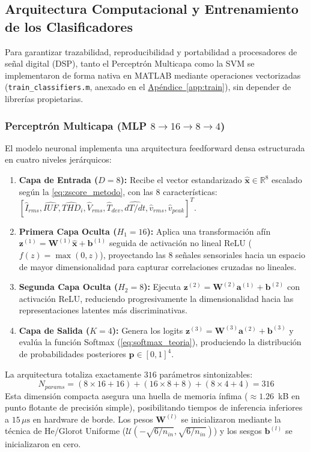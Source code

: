 \documentclass[conference]{IEEEtran}
\begin{document}
\subsection{Arquitectura Computacional y Entrenamiento de los Clasificadores}

Para garantizar trazabilidad, reproducibilidad y portabilidad a procesadores de señal digital (DSP), tanto el Perceptrón Multicapa como la SVM se implementaron de forma nativa en MATLAB mediante operaciones vectorizadas (\texttt{train\_classifiers.m}, anexado en el \hyperref[app:train]{Apéndice~\ref*{app:train}}), sin depender de librerías propietarias.

\subsubsection{\texorpdfstring{Perceptrón Multicapa (MLP $8 \to 16 \to 8 \to 4$)}{Perceptrón Multicapa (MLP 8 a 16 a 8 a 4)}}
El modelo neuronal implementa una arquitectura feedforward densa estructurada en cuatro niveles jerárquicos:
\begin{enumerate}
    \item \textbf{Capa de Entrada ($D = 8$):} Recibe el vector estandarizado $\hat{\mathbf{x}} \in \mathbb{R}^8$ escalado según la \autoref{eq:zscore_metodo}, con las 8 características: $[\hat{I}_{rms}, \widehat{IUF}, \widehat{THD}_i, \hat{V}_{rms}, \hat{T}_{dev}, \widehat{dT/dt}, \hat{v}_{rms}, \hat{v}_{peak}]^T$.
    \item \textbf{Primera Capa Oculta ($H_1 = 16$):} Aplica una transformación afín $\mathbf{z}^{(1)} = \mathbf{W}^{(1)}\hat{\mathbf{x}} + \mathbf{b}^{(1)}$ seguida de activación no lineal ReLU ($f(z) = \max(0, z)$), proyectando las 8 señales sensoriales hacia un espacio de mayor dimensionalidad para capturar correlaciones cruzadas no lineales.
    \item \textbf{Segunda Capa Oculta ($H_2 = 8$):} Ejecuta $\mathbf{z}^{(2)} = \mathbf{W}^{(2)}\mathbf{a}^{(1)} + \mathbf{b}^{(2)}$ con activación ReLU, reduciendo progresivamente la dimensionalidad hacia las representaciones latentes más discriminativas.
    \item \textbf{Capa de Salida ($K = 4$):} Genera los logits $\mathbf{z}^{(3)} = \mathbf{W}^{(3)}\mathbf{a}^{(2)} + \mathbf{b}^{(3)}$ y evalúa la función Softmax (\autoref{eq:softmax_teoria}), produciendo la distribución de probabilidades posteriores $\mathbf{p} \in [0, 1]^4$.
\end{enumerate}

La arquitectura totaliza exactamente $316$ parámetros sintonizables:
\begin{equation}
    N_{params} = (8 \times 16 + 16) + (16 \times 8 + 8) + (8 \times 4 + 4) = 316
    \label{eq:conteo_pesos}
\end{equation}
Esta dimensión compacta asegura una huella de memoria ínfima ($\approx 1.26$~kB en punto flotante de precisión simple), posibilitando tiempos de inferencia inferiores a $15\,\mu\text{s}$ en hardware de borde. Los pesos $\mathbf{W}^{(l)}$ se inicializaron mediante la técnica de He/Glorot Uniforme ($\mathcal{U}(-\sqrt{6/n_{in}}, \sqrt{6/n_{in}})$) y los sesgos $\mathbf{b}^{(l)}$ se inicializaron en cero.
\end{document}
